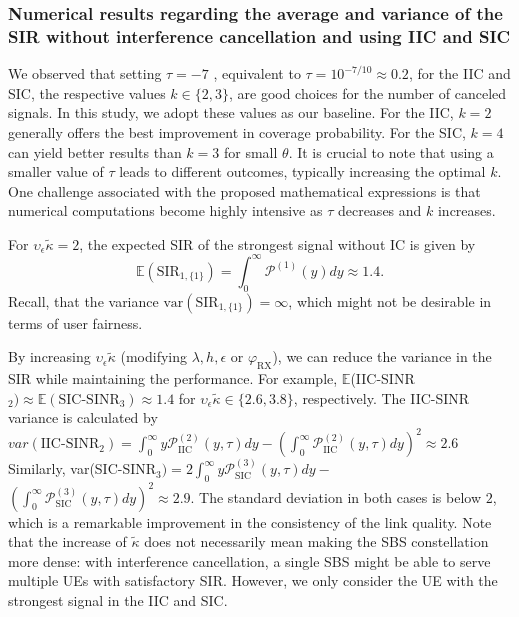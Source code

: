 \documentclass[lettersize,journal]{IEEEtran}
\begin{document}
\subsubsection{Numerical results regarding the average and variance of the SIR without interference cancellation and using IIC and SIC}


We observed that setting $\tau = -7$ , equivalent to $\tau = 10^{-7/10} \approx 0.2$, for the IIC and SIC, the respective values $k \in \{2,3\}$, are good choices for the number of canceled signals. In this study, we adopt these values as our baseline. For the IIC, $k = 2$ generally offers the best improvement in coverage probability. For the SIC, $k = 4$ can yield better results than $k = 3$ for small $\theta$. It is crucial to note that using a smaller value of $\tau$ leads to different outcomes, typically increasing the optimal $k$. One challenge associated with the proposed mathematical expressions is that numerical computations become highly intensive as $\tau$ decreases and $k$ increases.


For $\upsilon_{\epsilon} \tilde{\kappa}=2$, the expected SIR of the strongest signal without IC is given by
\begin{equation}
  \mathbb{E}(\text{SIR}_{1,\{1\}})= \int_{0}^{\infty}\mathcal{P}^{(1)}(y)dy \approx 1.4.
\end{equation}
  Recall, that the variance $\text{var}(\text{SIR}_{1,\{1\}})=\infty$, which might not be desirable in terms of user fairness.

  By increasing $\upsilon_{\epsilon} \tilde{\kappa}$ (modifying $\lambda,h,\epsilon$ or $\varphi_{\text{RX}}$), we can reduce the variance in the SIR while maintaining the performance. For example, $ \mathbb{E}$(IIC-SINR$_{2}) \approx \mathbb{E}(\text{SIC-SINR}_{3}) \approx 1.4$ for $\upsilon_{\epsilon} \tilde{\kappa}\in \{2.6,3.8\}$, respectively. The IIC-SINR variance is calculated by
  $var(\text{IIC-SINR}_{2})=\int_{0}^{\infty}y\mathcal{P}_{\text{IIC}}^{(2)}(y,\tau)dy -\left(\int_{0}^{\infty}\mathcal{P}_{\text{IIC}}^{(2)}(y,\tau)dy\right)^2  \approx 2.6$ Similarly, var(SIC-SINR$_{3}) = 2\int_{0}^{\infty}y\mathcal{P}_{\text{SIC}}^{(3)}(y,\tau)dy-$ $\left(\int_{0}^{\infty}\mathcal{P}_{\text{SIC}}^{(3)}(y,\tau)dy\right)^2 \approx 2.9$. The standard deviation in both cases is below $2$, which is a remarkable improvement in the consistency of the link quality. Note that the increase of $\tilde{\kappa}$ does not necessarily mean making the SBS constellation more dense: with interference cancellation, a single SBS might be able to serve multiple UEs with satisfactory SIR. However, we only consider the UE with the strongest signal in the IIC and SIC.
\end{document}

